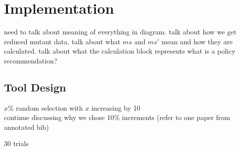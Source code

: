 \section{Implementation}


need to talk about meaning of everything in diagram.
talk about how we get reduced mutant data.
talk about what $ms$ and $ms'$ mean and how they are calculated.
talk about what the calculation block represents
what is a policy recommendation?

\subsection{Tool Design}

$x\%$ random selection with $x$ increasing by 10 \\

continue discussing why we chose 10\% increments (refer to one paper from annotated bib)

30 trials

